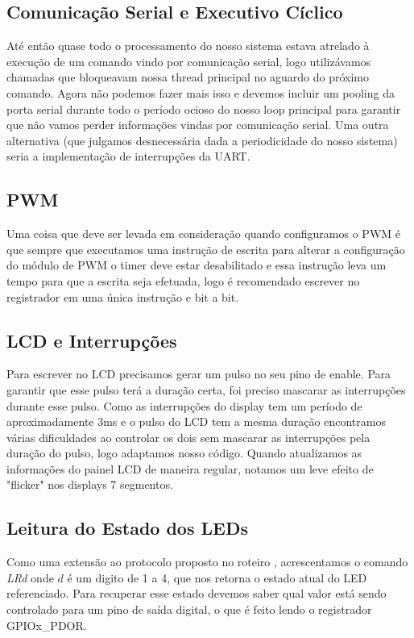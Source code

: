 \documentclass{article}
\begin{document}
\subsection{Comunicação Serial e Executivo Cíclico}
Até então quase todo o processamento do nosso sistema estava atrelado à execução de um comando vindo por comunicação serial, logo utilizávamos chamadas que bloqueavam nossa thread principal no aguardo do próximo comando. Agora não podemos fazer mais isso e devemos incluir um pooling da porta serial durante todo o período ocioso do nosso loop principal para garantir que não vamos perder informações vindas por comunicação serial. Uma outra alternativa (que julgamos desnecessária dada a periodicidade do nosso sistema) seria a implementação de interrupções da UART.

\subsection{PWM}
Uma coisa que deve ser levada em consideração quando configuramos o PWM é que sempre que executamos uma instrução de escrita para alterar a configuração do módulo de PWM o timer deve estar desabilitado e essa instrução leva um tempo para que a escrita seja efetuada, logo é recomendado escrever no registrador em uma única instrução e bit a bit. 

\subsection{LCD e Interrupções}
Para escrever no LCD precisamos gerar um pulso no seu pino de enable. Para garantir que esse pulso terá a duração certa, foi preciso mascarar as interrupções durante esse pulso. Como as interrupções do display tem um período de aproximadamente 3ms e o pulso do LCD tem a mesma duração encontramos várias dificuldades ao controlar os dois sem mascarar as interrupções pela duração do pulso, logo adaptamos nosso código. Quando atualizamos as informações do painel LCD de maneira regular, notamos um leve efeito de "flicker" nos displays 7 segmentos.

\subsection{Leitura do Estado dos LEDs}
Como uma extensão ao protocolo proposto no roteiro \cite{bb:roteiro}, acrescentamos o comando \textit{LRd} onde $d$ é um digito de 1 a 4, que nos retorna o estado atual do LED referenciado. Para recuperar esse estado devemos saber qual valor está sendo controlado para um pino de saída digital, o que é feito lendo o registrador GPIOx\_PDOR.
\end{document}
